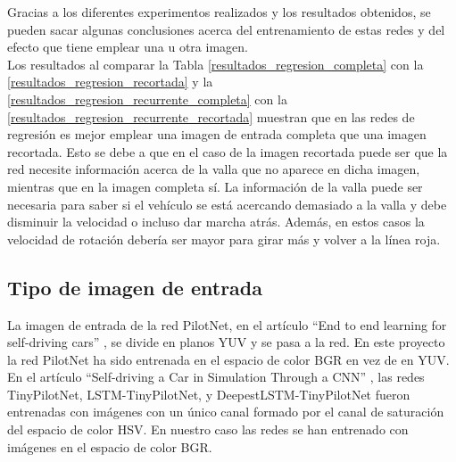Gracias a los diferentes experimentos realizados y los resultados obtenidos, se pueden sacar algunas conclusiones acerca del entrenamiento de estas redes y del efecto que tiene emplear una u otra imagen.\\


Los resultados al comparar la Tabla \ref{resultados_regresion_completa} con la \ref{resultados_regresion_recortada} y la \ref{resultados_regresion_recurrente_completa} con la \ref{resultados_regresion_recurrente_recortada} muestran que en las redes de regresión es mejor emplear una imagen de entrada completa que una imagen recortada. Esto se debe a que en el caso de la imagen recortada puede ser que la red necesite información acerca de la valla que no aparece en dicha imagen, mientras que en la imagen completa sí. La información de la valla puede ser necesaria para saber si el vehículo se está acercando demasiado a la valla y debe disminuir la velocidad o incluso dar marcha atrás. Además, en estos casos la velocidad de rotación debería ser mayor para girar más y volver a la línea roja.\\





\subsection{Tipo de imagen de entrada}

La imagen de entrada de la red PilotNet, en el artículo ``End to end learning for self-driving cars'' \cite{end2end}, se divide en planos YUV y se pasa a la red. En este proyecto la red PilotNet ha sido entrenada en el espacio de color BGR en vez de en YUV.\\

En el artículo ``Self-driving a Car in Simulation Through a CNN'' \cite{self-driving}, las redes TinyPilotNet, LSTM-TinyPilotNet, y DeepestLSTM-TinyPilotNet fueron entrenadas con imágenes con un único canal formado por el canal de saturación del espacio de color HSV. En nuestro caso las redes se han entrenado con imágenes en el espacio de color BGR.\\

